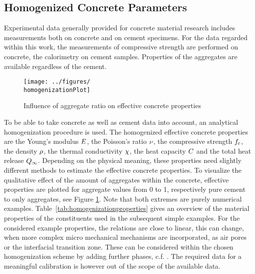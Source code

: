 \subsection{Homogenized Concrete Parameters}
Experimental data generally provided for concrete material research includes measurements both on concrete and on cement specimens.
For the data regarded within this work, the measurements of compressive strength are performed on concrete, the calorimetry on cement samples.
Properties of the aggregates are available regardless of the cement.\\
\begin{figure}[b]%
	\centering
	\texttt{[image: ../figures/\\homogenizationPlot]}
	\caption{Influence of aggregate ratio on effective concrete properties}\label{fig:homogenization}
\end{figure}
To be able to take concrete as well as cement data into account, an analytical homogenization procedure is used.
The homogenized effective concrete properties are the Young's modulus $E$, the Poisson's ratio $\nu$, the compressive strength $f_{\text{c}}$, the density $\rho$, the thermal conductivity $\chi$, the heat capacity $C$ and the total heat release $Q_{\infty}$.
Depending on the physical meaning, these properties need slightly different methods to estimate the effective concrete properties.
To visualize the qualitative effect of the amount of aggregates within the concrete, effective properties are plotted for aggregate values from 0 to 1, respectively pure cement to only aggregates, see Figure \ref{fig:homogenization}.
Note that both extremes are purely numerical examples.
\mbox{Table \ref{tab:homogenizationproperties}} gives an overview of the material properties of the constituents used in the subsequent simple examples.
For the considered example properties, the relations are close to linear, this can change, when more complex micro mechanical mechanisms are incorporated, as air pores or the interfacial transition zone.
These can be considered within the chosen homogenization scheme by adding further phases, c.f. \cite{nee_2012_ammf}.
The required data for a meaningful calibration is however out of the scope of the available data.
